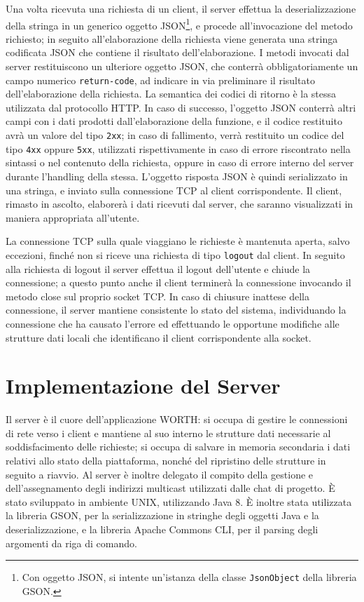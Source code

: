 \documentclass{article}
\begin{document}
Una volta ricevuta una richiesta di un client, il server effettua la deserializzazione della stringa in un generico oggetto JSON\footnote{Con oggetto JSON, si intente un'istanza della classe \texttt{JsonObject} della libreria GSON.}, e procede all'invocazione del metodo richiesto; in seguito all'elaborazione della richiesta viene generata una stringa codificata JSON che contiene il risultato dell'elaborazione. I metodi invocati dal server restituiscono un ulteriore oggetto JSON, che conterrà obbligatoriamente un campo numerico \texttt{return-code}, ad indicare in via preliminare il risultato dell'elaborazione della richiesta. La semantica dei codici di ritorno è la stessa utilizzata dal protocollo HTTP. In caso di successo, l'oggetto JSON conterrà altri campi con i dati prodotti dall'elaborazione della funzione, e il codice restituito avrà un valore del tipo \texttt{2xx}; in caso di fallimento, verrà restituito un codice del tipo \texttt{4xx} oppure \texttt{5xx}, utilizzati rispettivamente in caso di errore riscontrato nella sintassi o nel contenuto della richiesta, oppure in caso di errore interno del server durante l'handling della stessa. L'oggetto risposta JSON è quindi serializzato in una stringa, e inviato sulla connessione TCP al client corrispondente.
Il client, rimasto in ascolto, elaborerà i dati ricevuti dal server, che saranno visualizzati in maniera appropriata all'utente.

La connessione TCP sulla quale viaggiano le richieste è mantenuta aperta, salvo eccezioni, finché non si riceve una richiesta di tipo \texttt{logout} dal client. In seguito alla richiesta di logout il server effettua il logout dell'utente e chiude la connessione; a questo punto anche il client terminerà la connessione invocando il metodo close sul proprio socket TCP. In caso di chiusure inattese della connessione, il server mantiene consistente lo stato del sistema, individuando la connessione che ha causato l'errore ed effettuando le opportune modifiche alle strutture dati locali che identificano il client corrispondente alla socket.

\section{Implementazione del Server}
Il server è il cuore dell'applicazione WORTH: si occupa di gestire le connessioni di rete verso i client e mantiene al suo interno le strutture dati necessarie al soddisfacimento delle richieste; si occupa di salvare in memoria secondaria i dati relativi allo stato della piattaforma, nonché del ripristino delle strutture in seguito a riavvio. Al server è inoltre delegato il compito della gestione e dell'assegnamento degli indirizzi multicast utilizzati dalle chat di progetto.
È stato sviluppato in ambiente UNIX, utilizzando Java 8. È inoltre stata utilizzata la libreria GSON, per la serializzazione in stringhe degli oggetti Java e la deserializzazione, e la libreria Apache Commons CLI, per il parsing degli argomenti da riga di comando.
\end{document}
